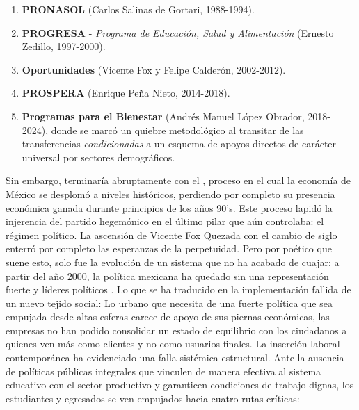\begin{enumerate}
    \item \textbf{PRONASOL} (Carlos Salinas de Gortari, 1988-1994).
    \item \textbf{PROGRESA} - \textit{Programa de Educación, Salud y Alimentación} (Ernesto Zedillo, 1997-2000).
    \item \textbf{Oportunidades} (Vicente Fox y Felipe Calderón, 2002-2012).
    \item \textbf{PROSPERA} (Enrique Peña Nieto, 2014-2018).
    \item \textbf{Programas para el Bienestar} (Andrés Manuel López Obrador, 2018-2024), donde se marcó un quiebre metodológico al transitar de las 
            transferencias \textit{condicionadas} a un esquema de apoyos directos de carácter universal por sectores demográficos.
\end{enumerate}
Sin embargo,  terminaría abruptamente con el , proceso en el cual la economía de México se desplomó a niveles
históricos, perdiendo por completo su presencia económica ganada durante principios de los años 90's. Este proceso lapidó la injerencia del partido hegemónico en
el último pilar que aún controlaba: el régimen político. La ascensión de Vicente Fox Quezada con el cambio de siglo enterró por completo las esperanzas de la perpetuidad. 
Pero por poético que suene esto, solo fue la evolución de un sistema que no ha acabado de cuajar; a partir del año 2000, la política mexicana ha quedado sin una 
representación fuerte y líderes políticos . Lo que se ha traducido en la implementación fallida de un nuevo tejido social: Lo urbano que necesita de 
una fuerte política que sea empujada desde altas esferas carece de apoyo de sus piernas económicas, las empresas no han podido consolidar un estado de equilibrio 
con los ciudadanos a quienes ven más como clientes y no como usuarios finales. La inserción laboral contemporánea ha evidenciado una falla sistémica estructural. 
Ante la ausencia de políticas públicas integrales que vinculen de manera efectiva al sistema educativo con el sector productivo y garanticen condiciones de trabajo 
dignas, los estudiantes y egresados se ven empujados hacia cuatro rutas críticas:

